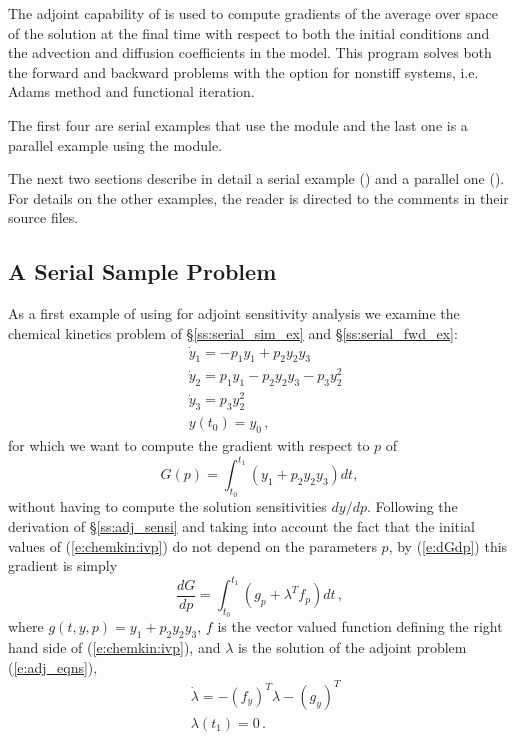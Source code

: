\begin{itemize}
  The adjoint capability of {\cvodes} is used to compute gradients
  of the average over space of the solution at the final time with
  respect to both the initial conditions and the advection and
  diffusion coefficients in the model.
  This program solves both the forward and backward problems with the option 
  for nonstiff systems, i.e. Adams method and functional iteration.
\end{itemize}
The first four are serial examples that use the {\nvecs} module and
the last one is a parallel example using the {\nvecp} module.

The next two sections describe in detail a serial example () and
a parallel one (). For details on the other examples, the reader is
directed to the comments in their source files.

\subsection{A Serial Sample Problem}\label{ss:serial_adj_ex}

As a first example of using {\cvodes} for adjoint sensitivity analysis
we examine the chemical kinetics problem of \S\ref{ss:serial_sim_ex} and
\S\ref{ss:serial_fwd_ex}:
\begin{equation}\label{e:chemkin:ivp}
  \begin{split}
    &{\dot y}_1 = -p_1 y_1 + p_2 y_2 y_3   \\
    &{\dot y}_2 =  p_1 y_1 - p_2 y_2 y_3 - p_3 y_2^2 \\
    &{\dot y}_3 =  p_3 y_2^2 \\
    &y(t_0) = y_0 \, ,
  \end{split}
\end{equation}
for which we want to compute the gradient with respect to $p$ of 
\begin{equation}\label{e:chemkin:G}
  G(p) = \int_{t_0}^{t_1}  \left( y_1 + p_2 y_2 y_3 \right) dt ,
\end{equation}
without having to compute the solution sensitivities ${dy}/{dp}$.
Following the derivation of \S\ref{ss:adj_sensi} and taking into account
the fact that the initial values of (\ref{e:chemkin:ivp}) do not depend on 
the parameters $p$, by (\ref{e:dGdp}) this gradient is simply
\begin{equation}\label{e:chemkin:dGdp}
\frac{dG}{dp} = \int_{t_0}^{t_1} 
\left( g_p + \lambda^T f_p \right) dt \, ,
\end{equation}
where $g(t,y,p) = y_1 + p_2 y_2 y_3$, $f$ is the vector valued function 
defining the right hand side of (\ref{e:chemkin:ivp}), and $\lambda$ is 
the solution of the adjoint problem (\ref{e:adj_eqns}),
\begin{equation}\label{e:chemkin:adj}
  \begin{split}
    &{\dot \lambda} = - (f_y)^T  \lambda - (g_y)^T \\
    &\lambda(t_1) = 0 \, .
  \end{split}
\end{equation}

